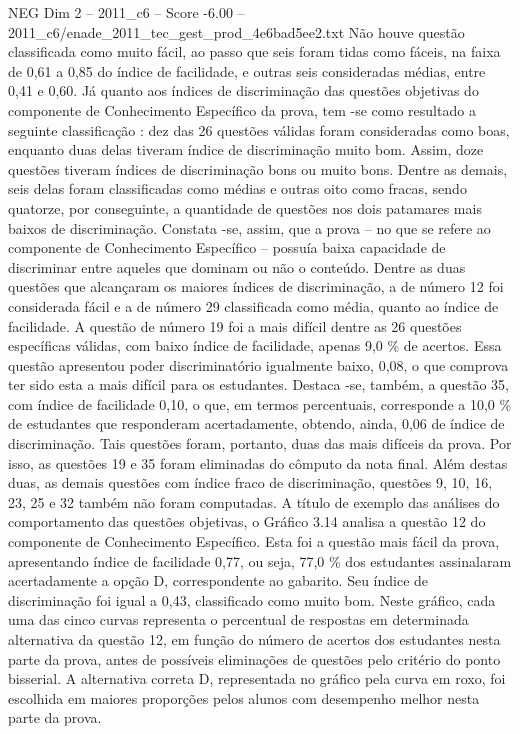 \begin{textsample}{NEG Dim 2 – 2011\_c6 – Score -6.00 – 2011\_c6/enade\_2011\_tec\_gest\_prod\_4e6bad5ee2.txt}
Não houve questão classificada como muito fácil, ao passo que seis foram tidas como fáceis, na faixa de 0,61 a 0,85 do índice de facilidade, e outras seis consideradas médias, entre 0,41 e 0,60.
Já quanto aos índices de discriminação das questões objetivas do componente de Conhecimento Específico da prova, tem -se como resultado a seguinte classificação : dez das 26 questões válidas foram consideradas como boas, enquanto duas delas tiveram índice de discriminação muito bom.
Assim, doze questões tiveram índices de discriminação bons ou muito bons.
Dentre as demais, seis delas foram classificadas como médias e outras oito como fracas, sendo quatorze, por conseguinte, a quantidade de questões nos dois patamares mais baixos de discriminação.
Constata -se, assim, que a prova – no que se refere ao componente de Conhecimento Específico – possuía baixa capacidade de discriminar entre aqueles que dominam ou não o conteúdo.
Dentre as duas questões que alcançaram os maiores índices de discriminação, a de número 12 foi considerada fácil e a de número 29 classificada como média, quanto ao índice de facilidade.
A questão de número 19 foi a mais difícil dentre as 26 questões específicas válidas, com baixo índice de facilidade, apenas 9,0 \% de acertos.
Essa questão apresentou poder discriminatório igualmente baixo, 0,08, o que comprova ter sido esta a mais difícil para os estudantes.
Destaca -se, também, a questão 35, com índice de facilidade 0,10, o que, em termos percentuais, corresponde a 10,0 \% de estudantes que responderam acertadamente, obtendo, ainda, 0,06 de índice de discriminação.
Tais questões foram, portanto, duas das mais difíceis da prova.
Por isso, as questões 19 e 35 foram eliminadas do cômputo da nota final.
Além destas duas, as demais questões com índice fraco de discriminação, questões 9, 10, 16, 23, 25 e 32 também não foram computadas.
A título de exemplo das análises do comportamento das questões objetivas, o Gráfico 3.14 analisa a questão 12 do componente de Conhecimento Específico.
Esta foi a questão mais fácil da prova, apresentando índice de facilidade 0,77, ou seja, 77,0 \% dos estudantes assinalaram acertadamente a opção D, correspondente ao gabarito.
Seu índice de discriminação foi igual a 0,43, classificado como muito bom.
Neste gráfico, cada uma das cinco curvas representa o percentual de respostas em determinada alternativa da questão 12, em função do número de acertos dos estudantes nesta parte da prova, antes de possíveis eliminações de questões pelo critério do ponto bisserial.
A alternativa correta D, representada no gráfico pela curva em roxo, foi escolhida em maiores proporções pelos alunos com desempenho melhor nesta parte da prova.

\end{textsample}
